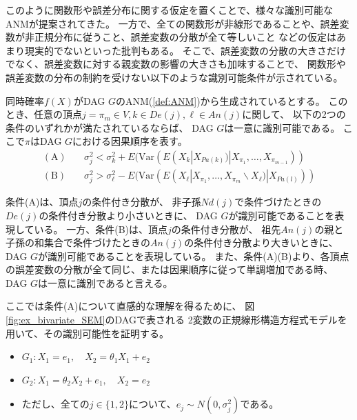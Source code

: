 このように関数形や誤差分布に関する仮定を置くことで、様々な識別可能なANMが提案されてきた。
一方で、全ての関数形が非線形であることや、誤差変数が非正規分布に従うこと、誤差変数の分散が全て等しいこと
などの仮定はあまり現実的でないといった批判もある。
そこで、誤差変数の分散の大きさだけでなく、誤差変数に対する親変数の影響の大きさも加味することで、
関数形や誤差変数の分布の制約を受けない以下のような識別可能条件が示されている\cite{Park2020-ey}。

\begin{theo}
  同時確率$f(X)$がDAG $G$のANM(\ref{def:ANM})から生成されているとする。
  このとき、任意の頂点$j = \pi_m \in V, k \in De(j), \ell \in An(j)$に関して、
  以下の2つの条件のいずれかが満たされているならば、
  DAG $G$は一意に識別可能である。
  ここで$\pi$はDAG $G$における因果順序を表す。
  \begin{align*}
    (\text{A}) \quad &\sigma_j^2 < \sigma_k^2 + E(\mathrm{Var}(E(X_k | X_{Pa(k)}) | X_{\pi_1}, \dots, X_{\pi_{m-1}})) \\
    (\text{B}) \quad &\sigma_j^2 > \sigma_{\ell}^2 - E(\mathrm{Var}(E(X_{\ell} | X_{\pi_1}, \dots, X_{\pi_m} \backslash X_{\ell}) | X_{Pa(l)}))
  \end{align*}
\end{theo}

条件(A)は、頂点$j$の条件付き分散が、
非子孫$\mathit{Nd}(j)$で条件づけたときの$De(j)$の条件付き分散より小さいときに、
DAG $G$が識別可能であることを表現している。
一方、条件(B)は、頂点$j$の条件付き分散が、
祖先$An(j)$の親と子孫の和集合で条件づけたときの$An(j)$の条件付き分散より大きいときに、
DAG $G$が識別可能であることを表現している。
また、条件(A)(B)より、各頂点の誤差変数の分散が全て同じ、または因果順序に従って単調増加である時、
DAG $G$は一意に識別であると言える。

ここでは条件(A)について直感的な理解を得るために、
図\ref{fig:ex_bivariate_SEM}のDAGで表される
2変数の正規線形構造方程式モデルを用いて、その識別可能性を証明する。

\begin{itemize}
  \item
  $G_1 \colon X_1 = e_1,
   \quad X_2 = \theta_1 X_1 + e_2$

  \item
  $G_2 \colon X_1 = \theta_2 X_2 + e_1,
   \quad X_2 = e_2$

  \item
  ただし、全ての$j \in \{ 1,2 \}$について、$e_j \sim N(0, \sigma_j^2)$である。
\end{itemize}

